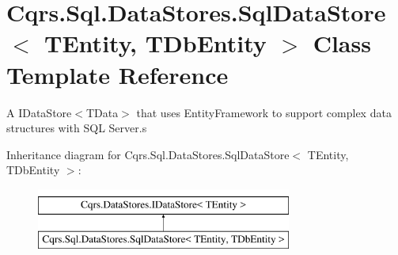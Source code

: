 \hypertarget{classCqrs_1_1Sql_1_1DataStores_1_1SqlDataStore}{}\section{Cqrs.\+Sql.\+Data\+Stores.\+Sql\+Data\+Store$<$ T\+Entity, T\+Db\+Entity $>$ Class Template Reference}
\label{classCqrs_1_1Sql_1_1DataStores_1_1SqlDataStore}


A I\+Data\+Store$<$\+T\+Data$>$ that uses Entity\+Framework to support complex data structures with S\+QL Server.\+s  


Inheritance diagram for Cqrs.\+Sql.\+Data\+Stores.\+Sql\+Data\+Store$<$ T\+Entity, T\+Db\+Entity $>$\+:\begin{figure}[H]
\begin{center}
\leavevmode
\includegraphics[height=2.000000cm]{classCqrs_1_1Sql_1_1DataStores_1_1SqlDataStore}
\end{center}
\end{figure}
